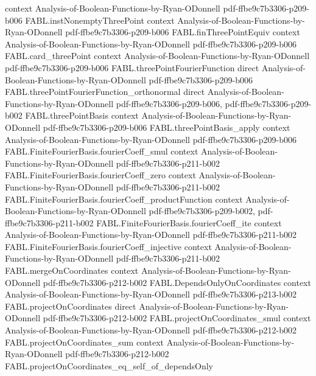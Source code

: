 \begin{theorem}
  {context}
  {Analysis-of-Boolean-Functions-by-Ryan-ODonnell}
  {pdf-ffbe9c7b3306-p209-b006}
\proofstep
  {FABL.instNonemptyThreePoint}
  {context}
  {Analysis-of-Boolean-Functions-by-Ryan-ODonnell}
  {pdf-ffbe9c7b3306-p209-b006}
\proofstep
  {FABL.finThreePointEquiv}
  {context}
  {Analysis-of-Boolean-Functions-by-Ryan-ODonnell}
  {pdf-ffbe9c7b3306-p209-b006}
\proofstep
  {FABL.card_threePoint}
  {context}
  {Analysis-of-Boolean-Functions-by-Ryan-ODonnell}
  {pdf-ffbe9c7b3306-p209-b006}
\proofstep
  {FABL.threePointFourierFunction}
  {direct}
  {Analysis-of-Boolean-Functions-by-Ryan-ODonnell}
  {pdf-ffbe9c7b3306-p209-b006}
\proofstep
  {FABL.threePointFourierFunction_orthonormal}
  {direct}
  {Analysis-of-Boolean-Functions-by-Ryan-ODonnell}
  {pdf-ffbe9c7b3306-p209-b006,
    pdf-ffbe9c7b3306-p209-b002}
\proofstep
  {FABL.threePointBasis}
  {context}
  {Analysis-of-Boolean-Functions-by-Ryan-ODonnell}
  {pdf-ffbe9c7b3306-p209-b006}
\proofstep
  {FABL.threePointBasis_apply}
  {context}
  {Analysis-of-Boolean-Functions-by-Ryan-ODonnell}
  {pdf-ffbe9c7b3306-p209-b006}
\proofstep
  {FABL.FiniteFourierBasis.fourierCoeff_smul}
  {context}
  {Analysis-of-Boolean-Functions-by-Ryan-ODonnell}
  {pdf-ffbe9c7b3306-p211-b002}
\proofstep
  {FABL.FiniteFourierBasis.fourierCoeff_zero}
  {context}
  {Analysis-of-Boolean-Functions-by-Ryan-ODonnell}
  {pdf-ffbe9c7b3306-p211-b002}
\proofstep
  {FABL.FiniteFourierBasis.fourierCoeff_productFunction}
  {context}
  {Analysis-of-Boolean-Functions-by-Ryan-ODonnell}
  {pdf-ffbe9c7b3306-p209-b002,
    pdf-ffbe9c7b3306-p211-b002}
\proofstep
  {FABL.FiniteFourierBasis.fourierCoeff_ite}
  {context}
  {Analysis-of-Boolean-Functions-by-Ryan-ODonnell}
  {pdf-ffbe9c7b3306-p211-b002}
\proofstep
  {FABL.FiniteFourierBasis.fourierCoeff_injective}
  {context}
  {Analysis-of-Boolean-Functions-by-Ryan-ODonnell}
  {pdf-ffbe9c7b3306-p211-b002}
\proofstep
  {FABL.mergeOnCoordinates}
  {context}
  {Analysis-of-Boolean-Functions-by-Ryan-ODonnell}
  {pdf-ffbe9c7b3306-p212-b002}
\proofstep
  {FABL.DependsOnlyOnCoordinates}
  {context}
  {Analysis-of-Boolean-Functions-by-Ryan-ODonnell}
  {pdf-ffbe9c7b3306-p213-b002}
\proofstep
  {FABL.projectOnCoordinates}
  {direct}
  {Analysis-of-Boolean-Functions-by-Ryan-ODonnell}
  {pdf-ffbe9c7b3306-p212-b002}
\proofstep
  {FABL.projectOnCoordinates_smul}
  {context}
  {Analysis-of-Boolean-Functions-by-Ryan-ODonnell}
  {pdf-ffbe9c7b3306-p212-b002}
\proofstep
  {FABL.projectOnCoordinates_sum}
  {context}
  {Analysis-of-Boolean-Functions-by-Ryan-ODonnell}
  {pdf-ffbe9c7b3306-p212-b002}
\proofstep
  {FABL.projectOnCoordinates_eq_self_of_dependsOnly}

\end{theorem}
